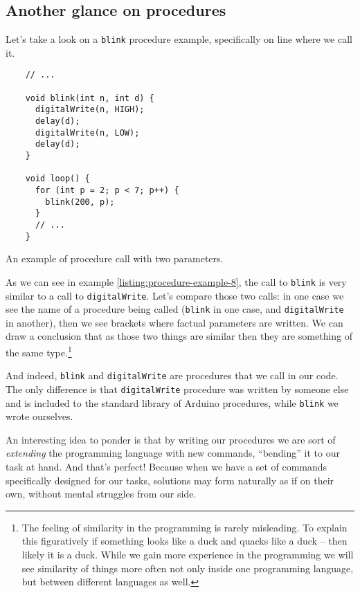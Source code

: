 \documentclass[../sparc.tex]{subfiles}
\begin{document}
\subsection{Another glance on procedures}

Let's take a look on a \texttt{blink} procedure example, specifically
on line where we call it.

\begin{listing}[H]
  \begin{verbatim}
    // ...

    void blink(int n, int d) {
      digitalWrite(n, HIGH);
      delay(d);
      digitalWrite(n, LOW);
      delay(d);
    }

    void loop() {
      for (int p = 2; p < 7; p++) {
        blink(200, p);
      }
      // ...
    }
  \end{verbatim}
  \label{listing:procedure-example-8}
  \caption{An example of procedure call with two parameters.}
\end{listing}

As we can see in example \ref{listing:procedure-example-8}, the call to
\texttt{blink} is very similar to a call to
\texttt{digitalWrite}.  Let's compare those two calls: in one case we
see the name of a procedure being called (\texttt{blink} in one case,
and \texttt{digitalWrite} in another), then we see brackets where
factual parameters are written.  We can draw a conclusion that as those two
things are similar then they are something of the same type.\footnote{The
feeling of similarity in the programming is rarely misleading.  To explain this
figuratively if something looks like a duck and quacks like a duck -- then likely
it is a duck.  While we gain more experience in the programming we will see
similarity of things more often not only inside one programming language, but
between different languages as well.}

And indeed, \texttt{blink} and \texttt{digitalWrite} are
procedures that we call in our code.  The only difference is that
\texttt{digitalWrite} procedure was written by someone else and is
included to the standard library of Arduino procedures, while
\texttt{blink} we wrote ourselves.

An interesting idea to ponder is that by writing our procedures we are sort of
\emph{extending} the programming language with new commands, ``bending'' it to
our task at hand.  And that's perfect!  Because when we have a set of commands
specifically designed for our tasks, solutions may form naturally as if on their
own, without mental struggles from our side.
\end{document}
